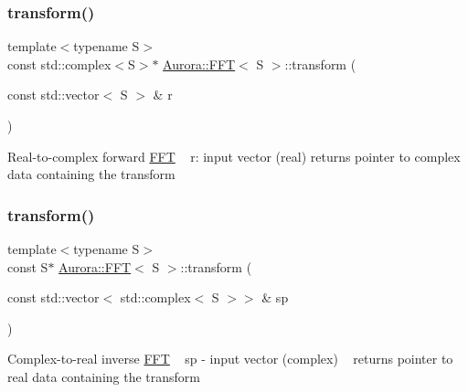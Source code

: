 \subsubsection{\texorpdfstring{transform()}{transform()}\hspace{0.1cm}{\footnotesize\ttfamily [2/3]}}
{\footnotesize\ttfamily template$<$typename S$>$ \\
const std\+::complex$<$S$>$$\ast$ \hyperlink{class_aurora_1_1_f_f_t}{Aurora\+::\+F\+FT}$<$ S $>$\+::transform (\begin{DoxyParamCaption}\item[{const std\+::vector$<$ S $>$ \&}]{r }\end{DoxyParamCaption})\hspace{0.3cm}{\ttfamily [inline]}}

Real-\/to-\/complex forward \hyperlink{class_aurora_1_1_f_f_t}{F\+FT} ~\newline
r\+: input vector (real) returns pointer to complex data containing the transform \mbox{\label{class_aurora_1_1_f_f_t_a9331bca89f3782409a7587611f1e4bab}} 
\subsubsection{\texorpdfstring{transform()}{transform()}\hspace{0.1cm}{\footnotesize\ttfamily [3/3]}}
{\footnotesize\ttfamily template$<$typename S$>$ \\
const S$\ast$ \hyperlink{class_aurora_1_1_f_f_t}{Aurora\+::\+F\+FT}$<$ S $>$\+::transform (\begin{DoxyParamCaption}\item[{const std\+::vector$<$ std\+::complex$<$ S $>$$>$ \&}]{sp }\end{DoxyParamCaption})\hspace{0.3cm}{\ttfamily [inline]}}

Complex-\/to-\/real inverse \hyperlink{class_aurora_1_1_f_f_t}{F\+FT} ~\newline
sp -\/ input vector (complex) ~\newline
returns pointer to real data containing the transform \mbox{\label{class_aurora_1_1_f_f_t_a67003935e240d8b4cf858430f6063913}} 
